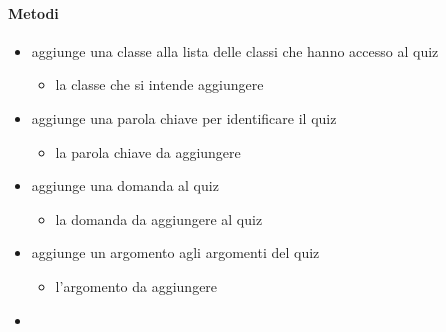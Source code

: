 \paragraph{Metodi}
\begin{itemize}
\item {}
\newline
aggiunge una classe alla lista delle classi che hanno accesso al quiz
\newline
{}
\newline
\begin{itemize}
\item {}
\newline
la classe che si intende aggiungere
\end{itemize}
\item {}
\newline
aggiunge una parola chiave per identificare il quiz
\newline
{}
\newline
\begin{itemize}
\item {}
\newline
la parola chiave da aggiungere
\end{itemize}
\item {}
\newline
aggiunge una domanda al quiz
\newline
{}
\newline
\begin{itemize}
\item {}
\newline
la domanda da aggiungere al quiz
\end{itemize}
\item {}
\newline
aggiunge un argomento agli argomenti del quiz
\newline
{}
\newline
\begin{itemize}
\item {}
\newline
l'argomento da aggiungere
\end{itemize}
\item {}

\end{itemize}

